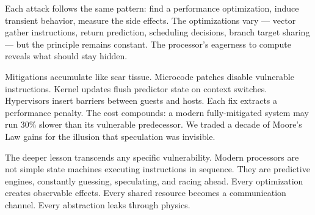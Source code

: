 Each attack follows the same pattern: find a performance optimization, induce transient behavior, measure the side effects. The optimizations vary — vector gather instructions, return prediction, scheduling decisions, branch target sharing — but the principle remains constant. The processor's eagerness to compute reveals what should stay hidden.

Mitigations accumulate like scar tissue. Microcode patches disable vulnerable instructions. Kernel updates flush predictor state on context switches. Hypervisors insert barriers between guests and hosts. Each fix extracts a performance penalty. The cost compounds: a modern fully-mitigated system may run 30\% slower than its vulnerable predecessor. We traded a decade of Moore's Law gains for the illusion that speculation was invisible.

The deeper lesson transcends any specific vulnerability. Modern processors are not simple state machines executing instructions in sequence. They are predictive engines, constantly guessing, speculating, and racing ahead. Every optimization creates observable effects. Every shared resource becomes a communication channel. Every abstraction leaks through physics.

\clearpage